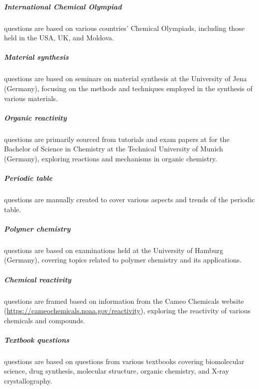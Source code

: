 \documentclass[11pt, oneside]{article}
\begin{document}
\begin{refsection}
\subparagraph{International Chemical Olympiad}
 questions are based on various countries' Chemical Olympiads, including those held in the USA, UK, and Moldova.

\subparagraph{Material synthesis}
 questions are based on seminars on material synthesis at the University of Jena (Germany), focusing on the methods and techniques employed in the synthesis of various materials.

\subparagraph{Organic reactivity}
  questions are primarily sourced from tutorials and exam papers at for the Bachelor of Science in Chemistry at the Technical University of Munich (Germany), exploring reactions and mechanisms in organic chemistry.

\subparagraph{Periodic table}
 questions are manually created to cover various aspects and trends of the periodic table.

\subparagraph{Polymer chemistry}
 questions are based on examinations held at the University of Hamburg (Germany), covering topics related to polymer chemistry and its applications.

\subparagraph{Chemical reactivity}
 questions are framed based on information from the Cameo Chemicals website (\url{https://cameochemicals.noaa.gov/reactivity}), exploring the reactivity of various chemicals and compounds.

\subparagraph{Textbook questions}
 questions are based on questions from various textbooks covering biomolecular science, drug synthesis, molecular structure, organic chemistry, and X-ray crystallography.


\end{refsection}
\end{document}
